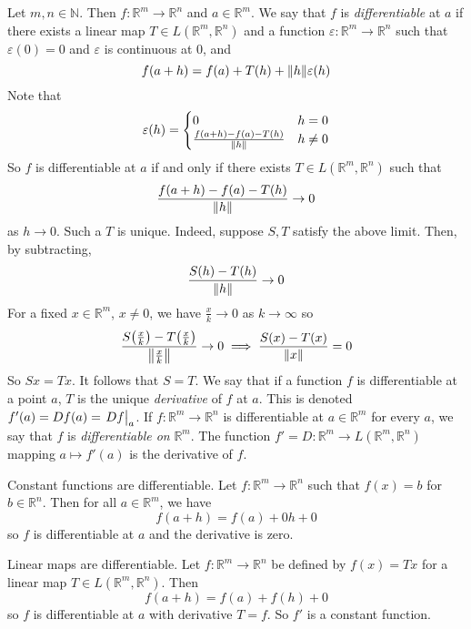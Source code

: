 \begin{definition}
	Let \( m, n \in \mathbb N \).
	Then \( f \colon \mathbb R^m \to \mathbb R^n \) and \( a \in \mathbb R^m \).
	We say that \( f \) is \textit{differentiable} at \( a \) if there exists a linear map \( T \in L(\mathbb R^m, \mathbb R^n) \) and a function \( \varepsilon \colon \mathbb R^m \to \mathbb R^n \) such that \( \varepsilon(0) = 0 \) and \( \varepsilon \) is continuous at \( 0 \), and
	\[
		f(a+h) = f(a) + T(h) + \norm{h} \varepsilon(h)
	\]
	Note that
	\[
		\varepsilon(h) = \begin{cases}
			0                                     & h = 0    \\
			\frac{f(a+h) - f(a) - T(h)}{\norm{h}} & h \neq 0
		\end{cases}
	\]
	So \( f \) is differentiable at \( a \) if and only if there exists \( T \in L(\mathbb R^m, \mathbb R^n) \) such that
	\[
		\frac{f(a+h) - f(a) - T(h)}{\norm{h}} \to 0
	\]
	as \( h \to 0 \).
	Such a \( T \) is unique.
	Indeed, suppose \( S, T \) satisfy the above limit.
	Then, by subtracting,
	\[
		\frac{S(h) - T(h)}{\norm{h}} \to 0
	\]
	For a fixed \( x \in \mathbb R^m \), \( x \neq 0 \), we have \( \frac{x}{k} \to 0 \) as \( k \to \infty \) so
	\[
		\frac{S\qty(\frac{x}{k}) - T\qty(\frac{x}{k})}{\norm{\frac{x}{k}}} \to 0 \implies \frac{S(x) - T(x)}{\norm{x}} = 0
	\]
	So \( Sx = Tx \).
	It follows that \( S = T \).
	We say that if a function \( f \) is differentiable at a point \( a \), \( T \) is the unique \textit{derivative} of \( f \) at \( a \).
	This is denoted \( f'(a) = Df(a) = \eval{Df}_a \).
	If \( f \colon \mathbb R^m \to \mathbb R^n \) is differentiable at \( a \in \mathbb R^m \) for every \( a \), we say that \( f \) is \textit{differentiable on} \( \mathbb R^m \).
	The function \( f' = D \colon \mathbb R^m \to L(\mathbb R^m, \mathbb R^n) \) mapping \( a \mapsto f'(a) \) is the derivative of \( f \).
\end{definition}
\begin{example}
	Constant functions are differentiable.
	Let \( f \colon \mathbb R^m \to \mathbb R^n \) such that \( f(x) = b \) for \( b \in \mathbb R^n \).
	Then for all \( a \in \mathbb R^m \), we have
	\[
		f(a+h) = f(a) + 0h + 0
	\]
	so \( f \) is differentiable at \( a \) and the derivative is zero.
\end{example}
\begin{example}
	Linear maps are differentiable.
	Let \( f \colon \mathbb R^m \to \mathbb R^n \) be defined by \( f(x) = Tx \) for a linear map \( T \in L(\mathbb R^m, \mathbb R^n) \).
	Then
	\[
		f(a+h) = f(a) + f(h) + 0
	\]
	so \( f \) is differentiable at \( a \) with derivative \( T = f \).
	So \( f' \) is a constant function.
\end{example}

